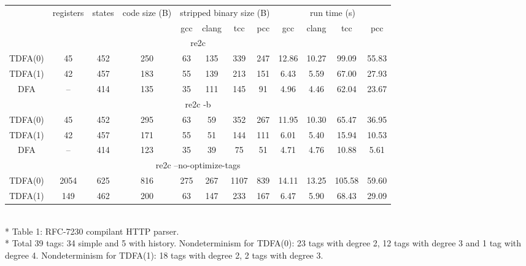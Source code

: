 \documentclass{article}
\theoremstyle{definition}
\begin{document}
\begin{center}
    \bigskip
    \begin{tabular}{|c|ccccccccccc|}
    \hline
    & registers & states & code size (B) & \multicolumn{4}{c}{stripped binary size (B)} & \multicolumn{4}{c|}{run time (s)} \\
    & & &
        & gcc & clang & tcc & pcc
        & gcc & clang & tcc & pcc \\
    \hline \hline
    \multicolumn{12}{|c|}{re2c} \\
    \hline
    TDFA(0) & 45 & 452 & 250 & 63 & 135 & 339 & 247 & 12.86 & 10.27 & 99.09 & 55.83 \\
    TDFA(1) & 42 & 457 & 183 & 55 & 139 & 213 & 151 &  6.43 &  5.59 & 67.00 & 27.93 \\
    DFA     & -- & 414 & 135 & 35 & 111 & 145 &  91 &  4.96 &  4.46 & 62.04 & 23.67 \\
    \hline \hline
    \multicolumn{12}{|c|}{re2c -b} \\
    \hline
    TDFA(0) & 45 & 452 & 295 & 63 & 59 & 352 & 267 & 11.95 & 10.30 & 65.47 & 36.95 \\
    TDFA(1) & 42 & 457 & 171 & 55 & 51 & 144 & 111 &  6.01 &  5.40 & 15.94 & 10.53 \\
    DFA     & -- & 414 & 123 & 35 & 39 &  75 &  51 &  4.71 &  4.76 & 10.88 &  5.61 \\
    \hline \hline
    \multicolumn{12}{|c|}{re2c --no-optimize-tags} \\
    \hline
    TDFA(0) & 2054 & 625 & 816 & 275 & 267 & 1107 & 839 & 14.11 & 13.25 & 105.58 & 59.60 \\
    TDFA(1) &  149 & 462 & 200 &  63 & 147 &  233 & 167 &  6.47 &  5.90 &  68.43 & 29.09 \\
    \hline
    \end{tabular}\\*
    \medskip
    Table 1: RFC-7230 compilant HTTP parser.\\*
    \medskip
    \small{Total 39 tags: 34 simple and 5 with history.
    Nondeterminism for TDFA(0): 23 tags with degree 2, 12 tags with degree 3 and 1 tag with degree 4.
    Nondeterminism for TDFA(1): 18 tags with degree 2, 2 tags with degree 3.}
    \bigskip
\end{center}
\end{document}
